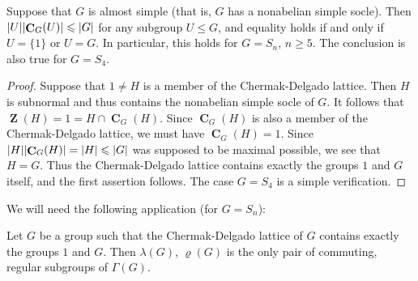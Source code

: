 \documentclass[ALCO,Unicode]{cedram}
\renewcommand{\rho}{\varrho}
\renewcommand{\geq}{\geqslant}
\renewcommand{\leq}{\leqslant}
\DeclarePairedDelimiter{\card}{\lvert}{\rvert}  %
\DeclareMathOperator{\Zentr}{\mathbf{Z}}     %
\DeclareMathOperator{\Centrl}{\mathbf{C}}     %
\begin{document}
\begin{lemma}\label{l:sn_cent_est}
    Suppose that $G$ is almost simple
    (that is, $G$ has a nonabelian simple
    socle). 
    Then $\card{U}\card{\Centrl_{G}(U)} \leq \card{G}$
    for any subgroup $U\leq G$,
    and equality holds if and only if
    $U = \{1\}$ or $U=G$.
    In particular, this holds for 
    $G= S_n$, $n\geq 5$.
    The conclusion is also true for $G=S_4$.
\end{lemma}

\begin{proof}
  Suppose that $1\neq H$ is a member of
  the Chermak-Delgado lattice.
  Then $H$ is subnormal and thus contains the nonabelian
  simple socle of $G$.
  It follows that $\Zentr(H)=1 = H \cap \Centrl_G(H)$.
  Since $\Centrl_G(H)$ is also a member of the Chermak-Delgado lattice,
  we must have $\Centrl_G(H)=1$.
  Since $\card{H}\card{\Centrl_G(H)} = \card{H} \leq \card{G}$
  was supposed to be maximal possible, we see that
  $H=G$.
  Thus the Chermak-Delgado lattice contains exactly the groups
  $1$ and $G$ itself,
  and the first assertion follows.
  The case $G=S_4$ is a simple verification.
\end{proof}

We will need the following application (for $G=S_n$):

\begin{lemma}\label{l:snwrc2_reg}
  Let $G$ be a group such that the Chermak-Delgado lattice of $G$
  contains exactly the groups $1$ and $G$.
  Then $\lambda(G)$, $\rho(G)$ is the only pair of
  commuting, regular subgroups of\/ $\Gamma(G)$.
\end{lemma}
\end{document}
